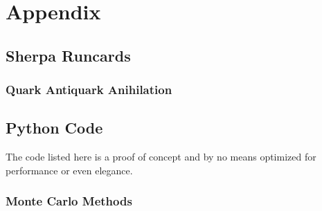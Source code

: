 \chapter{Appendix}%
\label{chap:appendix}

\section{Sherpa Runcards}%
\label{sec:runcards}

\subsection{Quark Antiquark Anihilation}%
\label{sec:qqggruncard}

\section{Python Code}%
\label{sec:pycode}
The code listed here is a proof of concept and by no means optimized
for performance or even elegance.

\subsection{Monte Carlo Methods}%
\label{sec:mcpy}

